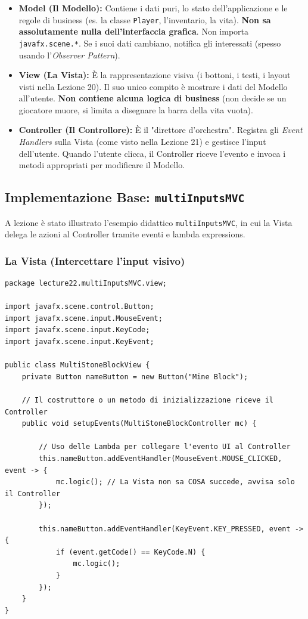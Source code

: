 \documentclass[12pt, a4paper]{article}
\begin{document}
\begin{itemize}
    \item \textbf{Model (Il Modello):} Contiene i dati puri, lo stato dell'applicazione e le regole di business (es. la classe \texttt{Player}, l'inventario, la vita). \textbf{Non sa assolutamente nulla dell'interfaccia grafica}. Non importa \texttt{javafx.scene.*}. Se i suoi dati cambiano, notifica gli interessati (spesso usando l'\textit{Observer Pattern}).
    \item \textbf{View (La Vista):} È la rappresentazione visiva (i bottoni, i testi, i layout visti nella Lezione 20). Il suo unico compito è mostrare i dati del Modello all'utente. \textbf{Non contiene alcuna logica di business} (non decide se un giocatore muore, si limita a disegnare la barra della vita vuota).
    \item \textbf{Controller (Il Controllore):} È il "direttore d'orchestra". Registra gli \textit{Event Handlers} sulla Vista (come visto nella Lezione 21) e gestisce l'input dell'utente. Quando l'utente clicca, il Controller riceve l'evento e invoca i metodi appropriati per modificare il Modello.
\end{itemize}

\newpage

\subsection{Implementazione Base: \texttt{multiInputsMVC}}
A lezione è stato illustrato l'esempio didattico \texttt{multiInputsMVC}, in cui la Vista delega le azioni al Controller tramite eventi e lambda expressions.

\subsubsection{La Vista (Intercettare l'input visivo)}
\begin{verbatim}
package lecture22.multiInputsMVC.view;

import javafx.scene.control.Button;
import javafx.scene.input.MouseEvent;
import javafx.scene.input.KeyCode;
import javafx.scene.input.KeyEvent;

public class MultiStoneBlockView {
    private Button nameButton = new Button("Mine Block");

    // Il costruttore o un metodo di inizializzazione riceve il Controller
    public void setupEvents(MultiStoneBlockController mc) {
        
        // Uso delle Lambda per collegare l'evento UI al Controller
        this.nameButton.addEventHandler(MouseEvent.MOUSE_CLICKED, event -> {
            mc.logic(); // La Vista non sa COSA succede, avvisa solo il Controller
        });
        
        this.nameButton.addEventHandler(KeyEvent.KEY_PRESSED, event -> {
            if (event.getCode() == KeyCode.N) {
                mc.logic();
            }
        });
    }
}
\end{verbatim}
\end{document}
